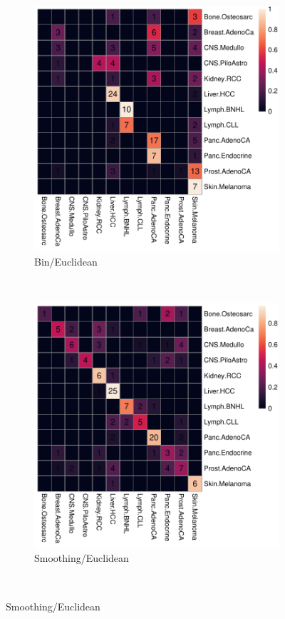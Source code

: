 \begin{figure}[htbp]
    \begin{subfigure}{.5\textwidth}
    \includegraphics[scale=0.6]{graphics/confustion_matrix_bins_euclidean.pdf}
    \caption{Bin/Euclidean}
    \label{fig:bin_euclidean}
    \end{subfigure}
    ~
    \begin{subfigure}{.5\textwidth}
    
    \includegraphics[scale=0.6]{graphics/confustion_matrix_smooth_euclidean.pdf}
    \caption{Smoothing/Euclidean}
    \label{fig:smooth_euclidean}
    \end{subfigure} \\
    \vspace{0.5cm}
    

\end{figure}
